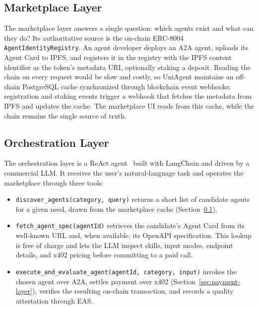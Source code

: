 \documentclass[sigconf]{acmart}
\begin{document}
\subsection{Marketplace Layer}
\label{sec:marketplace-layer}

The marketplace layer answers a single question: which agents exist and
what can they do? Its authoritative source is the on-chain ERC-8004
\texttt{AgentIdentityRegistry}. An agent developer deploys an A2A
agent, uploads its Agent Card to IPFS, and registers it in the registry
with the IPFS content identifier as the token's metadata URI, optionally
staking a deposit. Reading the chain on every request would be slow and
costly, so UniAgent maintains an off-chain PostgreSQL cache synchronized
through blockchain event webhooks: registration and staking events
trigger a webhook that fetches the metadata from IPFS and updates the
cache. The marketplace UI reads from this cache, while the chain remains
the single source of truth.

\subsection{Orchestration Layer}
\label{sec:orchestration-layer}

The orchestration layer is a ReAct agent~\cite{yao2023react} built with
LangChain and driven by a commercial LLM. It receives the user's
natural-language task and operates the marketplace through three tools:

\begin{sloppypar}
\begin{itemize}
  \item \texttt{discover\_agents(category, query)} returns a short list
    of candidate agents for a given need, drawn from the marketplace
    cache (Section~\ref{sec:marketplace-layer}).
  \item \texttt{fetch\_agent\_spec(agentId)} retrieves the candidate's
    Agent Card from its well-known URL and, when available, its OpenAPI
    specification. This lookup is free of charge and lets the LLM
    inspect skills, input modes, endpoint details, and x402 pricing
    before committing to a paid call.
  \item \texttt{execute\_and\_evaluate\_agent(agentId, category,
    input)} invokes the chosen agent over A2A, settles payment over
    x402 (Section~\ref{sec:payment-layer}), verifies the resulting
    on-chain transaction, and records a quality attestation through EAS.
\end{itemize}
\end{sloppypar}
\end{document}
